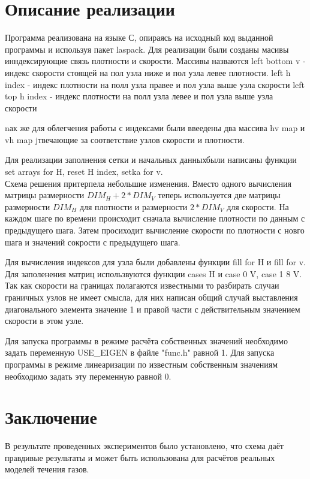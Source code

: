\documentclass[a4paper, 25pt]{article}
\begin{document}
\section{Описание реализации}
Программа реализована на языке С, опираясь на исходный код выданной программы и используя пакет laspack.
Для реализации были созданы масивы инндексирующие связь плотности и скорости. Массивы назваются left bottom v - индекс скорости стоящей на пол узла ниже и пол узла левее плотности.
left h index -  индекс плотности на полл узла правее и пол узла выше узла скорости
left top h index -  индекс плотности на полл узла левее и пол узла выше узла скорости

nак же для облегчения работы с индексами были ввеедены два массива hv map и vh map jтвечающие за соответствие узлов скорости и плотности.

Для реализации заполнения сетки и начальных данныхбыли написаны функции set arrays for H, reset H index, setka for v.\\
Схема решения притерпела небольшие изменения. Вместо одного вычисления матрицы размерности $DIM_H + 2 * DIM_V$ теперь используется две матрицы размерности $DIM_H$ для плотности  и размерности $2 * DIM_V$ для скорости. На каждом шаге по времени происходит сначала вычисление плотности по данным с предыдущего шага. Затем просиходит вычисление скорости по плотности с новго шага и значений сокрости с предыдущего шага. 

Для вычисления индексов для узла были добавлены функции fill for H и fill for v.
Для заполенения матриц использвуются функции cases H и case 0 V, case 1 8 V. Так как скорости на границах полагаются известными то разбирать случаи граничных узлов не имеет смысла, для них написан общий случай выставления диагонального элемента значение 1 и правой части с действительным значением скорости в этом узле.

Для запуска программы в режиме расчёта собственных значений необходимо задать переменную USE_EIGEN в файле "func.h" равной 1. Для запуска программы
в режиме линеаризации по известным собственным значениям необходимо задать эту переменную равной 0.

\section{Заключение}
В результате проведенных экспериментов было установлено, что схема даёт правдивые результаты и может быть использована для расчётов реальных моделей течения газов. 
\end{document}
